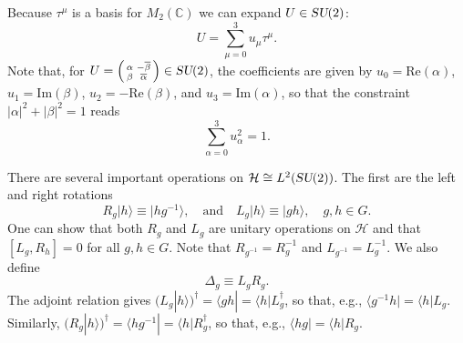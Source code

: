 \documentclass[12pt]{amsart}
\def\su2{\textsl{SU}(2)}
\theoremstyle{definition}
\theoremstyle{remark}
\numberwithin{equation}{section}
\begin{document}
Because $\tau^{\mu}$ is a basis for $M_2(\mathbb{C})$ we can expand $U\in \su2$:
\begin{equation}
	U = \sum_{\mu=0}^3 u_\mu \tau^\mu.
\end{equation}
Note that, for $U = \left(\begin{smallmatrix}\alpha & -\overline{\beta} \\ \beta & \overline{\alpha} \end{smallmatrix}\right) \in \su2$, the coefficients are given by $u_0 = \text{Re}(\alpha)$, $u_1 = \text{Im}(\beta)$, $u_2 = -\text{Re}(\beta)$, and $u_3 = \text{Im}(\alpha)$, so that the constraint $|\alpha|^2 + |\beta|^2 = 1$ reads
\begin{equation}
	\sum_{\alpha=0}^3 u_\alpha^2 = 1.
\end{equation}


There are several important operations on $\mathcal{H}\cong L^2(\su2)$. The first are the left and right rotations
\begin{equation}
	R_g|h\rangle \equiv |hg^{-1}\rangle, \quad \text{and}\quad L_g|h\rangle \equiv |gh\rangle, \quad g, h \in G.
\end{equation}
One can show that both $R_g$ and $L_g$ are unitary operations on $\mathcal{H}$ and that $[L_g, R_h] = 0$ for all $g,h\in G$. Note that $R_{g^{-1}} = R_{g}^{-1}$ and $L_{g^{-1}} = L_{g}^{-1}$. We also define 
\begin{equation}
	\Delta_{g} \equiv L_gR_g.
\end{equation}
The adjoint relation gives $(L_g|h\rangle)^\dag = \langle gh| = \langle h| L_g^\dag$, so that, e.g., $\langle g^{-1}h| = \langle h| L_g$. Similarly, $(R_g|h\rangle)^\dag = \langle hg^{-1}| = \langle h| R_g^\dag$, so that, e.g., $\langle hg| = \langle h| R_g$.
\end{document}
